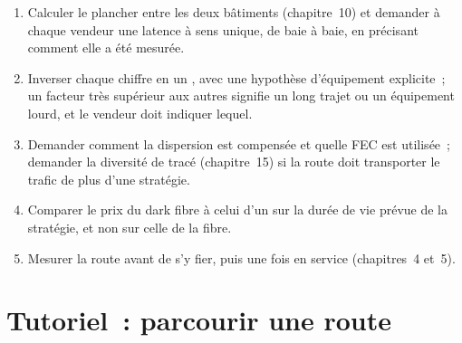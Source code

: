 \begin{method}\label{met:nw:long-haul-fibre:choose}
\begin{enumerate}
\item Calculer le plancher entre les deux bâtiments (chapitre~10) et demander à chaque vendeur une latence à sens unique, de baie à baie,
  en précisant comment elle a été mesurée.
\item Inverser chaque chiffre en un , avec une hypothèse d'équipement explicite~; un facteur très supérieur aux autres signifie un long trajet ou
  un équipement lourd, et le vendeur doit indiquer lequel.
\item Demander comment la dispersion est compensée et quelle FEC est utilisée~; demander la diversité de tracé (chapitre~15) si la route doit transporter le trafic
  de plus d'une stratégie.
\item Comparer le prix du dark fibre à celui d'un  sur la durée de vie prévue de la stratégie, et non sur celle de la fibre.
\item Mesurer la route avant de s'y fier, puis une fois en service (chapitres~4 et~5).
\end{enumerate}
\end{method}

\section{Tutoriel~: parcourir une route}\label{tut:nw:long-haul-fibre:tut}

